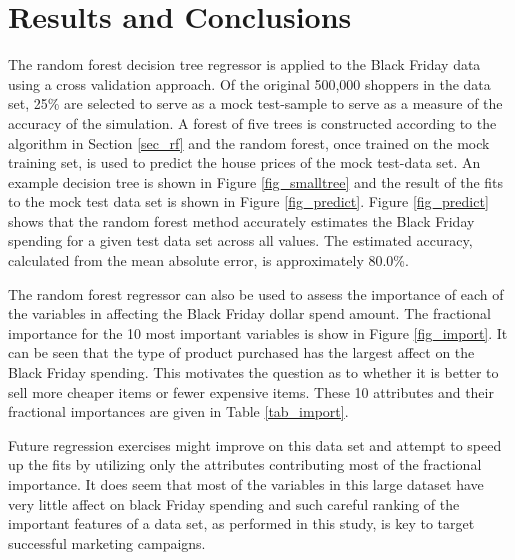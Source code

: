 \documentclass[10pt]{article}
\begin{document}
\section{Results and Conclusions}
The random forest decision tree regressor is applied to the Black Friday data using a cross validation approach. Of the original 500,000 shoppers in the data set, 25\% are selected to serve as a mock test-sample to serve as a measure of the accuracy of the simulation. A forest of five trees is constructed according to the algorithm in Section \ref{sec_rf} and the random forest, once trained on the mock training set, is used to predict the house prices of the mock test-data set. An example decision tree is shown in Figure \ref{fig_smalltree} and the result of the fits to the mock test data set is shown in Figure \ref{fig_predict}. Figure \ref{fig_predict} shows that the random forest method accurately estimates the Black Friday spending for a given test data set across all values. The estimated accuracy, calculated from the mean absolute error, is approximately 80.0\%. 

The random forest regressor can also be used to assess the importance of each of the variables in affecting the Black Friday dollar spend amount. The fractional importance for the 10 most important variables is show in Figure \ref{fig_import}. It can be seen that the type of product purchased has the largest affect on the Black Friday spending. This motivates the question as to whether it is better to sell more cheaper items or fewer expensive items.  These 10 attributes and their fractional importances are given in Table \ref{tab_import}. 



Future regression exercises might improve on this data set and attempt to speed up the fits by utilizing only the attributes contributing most of the fractional importance. It does seem that most of the variables in this large dataset have very little affect on black Friday spending and such careful ranking of the important features of a data set, as performed in this study, is key to target successful marketing campaigns.
\end{document}
